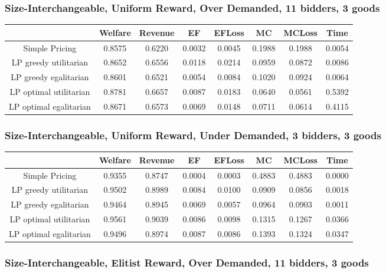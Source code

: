 \subsubsection*{Size-Interchangeable, Uniform Reward, Over Demanded, 11 bidders, 3 goods} 
\begin{tabular}{|c|c|c|c|c|c|c|c|}\hline
                            	&Welfare	&Revenue	&EF	&EFLoss	&MC	&MCLoss	&Time	\\\hline
                Simple Pricing	&0.8575	&0.6220	&0.0032	&0.0045	&0.1988	&0.1988	&0.0054	\\\hline 
         LP greedy utilitarian	&0.8652	&0.6556	&0.0118	&0.0214	&0.0959	&0.0872	&0.0086	\\\hline 
         LP greedy egalitarian	&0.8601	&0.6521	&0.0054	&0.0084	&0.1020	&0.0924	&0.0064	\\\hline 
        LP optimal utilitarian	&0.8781	&0.6657	&0.0087	&0.0183	&0.0640	&0.0561	&0.5392	\\\hline 
        LP optimal egalitarian	&0.8671	&0.6573	&0.0069	&0.0148	&0.0711	&0.0614	&0.4115	\\\hline 
\end{tabular}\subsubsection*{Size-Interchangeable, Uniform Reward, Under Demanded, 3 bidders, 3 goods} 
\begin{tabular}{|c|c|c|c|c|c|c|c|}\hline
                            	&Welfare	&Revenue	&EF	&EFLoss	&MC	&MCLoss	&Time	\\\hline
                Simple Pricing	&0.9355	&0.8747	&0.0004	&0.0003	&0.4883	&0.4883	&0.0000	\\\hline 
         LP greedy utilitarian	&0.9502	&0.8989	&0.0084	&0.0100	&0.0909	&0.0856	&0.0018	\\\hline 
         LP greedy egalitarian	&0.9464	&0.8945	&0.0069	&0.0057	&0.0964	&0.0903	&0.0011	\\\hline 
        LP optimal utilitarian	&0.9561	&0.9039	&0.0086	&0.0098	&0.1315	&0.1267	&0.0366	\\\hline 
        LP optimal egalitarian	&0.9496	&0.8974	&0.0087	&0.0086	&0.1393	&0.1324	&0.0347	\\\hline 
\end{tabular}\subsubsection*{Size-Interchangeable, Elitist Reward, Over Demanded, 11 bidders, 3 goods} 
